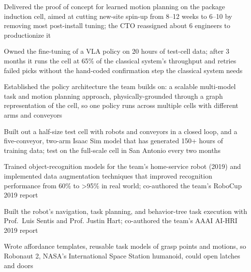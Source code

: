 \documentclass[]{deedy-resume-openfont}
\renewcommand{\sectionsep}{\vspace{3pt}}
\begin{document}
\begin{minipage}[t]{0.66\textwidth}
\begin{tightemize}
\item Delivered the proof of concept for learned motion planning on the package induction cell, aimed at cutting new-site spin-up from 8–12 weeks to 6–10 by removing most post-install tuning; the CTO reassigned about 6 engineers to productionize it
\item Owned the fine-tuning of a VLA policy on 20 hours of test-cell data; after 3 months it runs the cell at 65\% of the classical system's throughput and retries failed picks without the hand-coded confirmation step the classical system needs
\item Established the policy architecture the team builds on: a scalable multi-model task and motion planning approach, physically-grounded through a graph representation of the cell, so one policy runs across multiple cells with different arms and conveyors
\item Built out a half-size test cell with robots and conveyors in a closed loop, and a five-conveyor, two-arm Isaac Sim model that has generated 150+ hours of training data; test on the full-scale cell in San Antonio every two months
\end{tightemize}
\sectionsep

\begin{tightemize}
\item Trained object-recognition models for the team's home-service robot (2019) and implemented data augmentation techniques that improved recognition performance from 60\% to >95\% in real world; co-authored the team's RoboCup 2019 report
\item Built the robot's navigation, task planning, and behavior-tree task execution with Prof.\ Luis Sentis and Prof. Justin Hart; co-authored the team's AAAI AI-HRI 2019 report
\end{tightemize}
\sectionsep

\begin{tightemize}
\item Wrote affordance templates, reusable task models of grasp points and motions, so Robonaut 2, NASA's International Space Station humanoid, could open latches and doors
\end{tightemize}
\sectionsep


\end{minipage}
\end{document}
